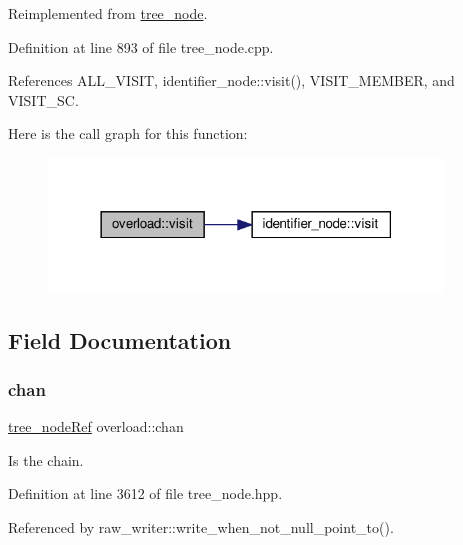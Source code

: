 Reimplemented from \hyperlink{classtree__node_aa9abba3f1b30e0be80b4a56b188c6ecc}{tree\+\_\+node}.



Definition at line 893 of file tree\+\_\+node.\+cpp.



References A\+L\+L\+\_\+\+V\+I\+S\+IT, identifier\+\_\+node\+::visit(), V\+I\+S\+I\+T\+\_\+\+M\+E\+M\+B\+ER, and V\+I\+S\+I\+T\+\_\+\+SC.

Here is the call graph for this function\+:
\nopagebreak
\begin{figure}[H]
\begin{center}
\leavevmode
\includegraphics[width=297pt]{d5/d1a/structoverload_af5069d7e549fbd84ae60f60b8efaf225_cgraph}
\end{center}
\end{figure}


\subsection{Field Documentation}
\mbox{\label{structoverload_a877c1bc09e35824204573c3f0bf4d80b}} 
\subsubsection{\texorpdfstring{chan}{chan}}
{\footnotesize\ttfamily \hyperlink{tree__node_8hpp_a6ee377554d1c4871ad66a337eaa67fd5}{tree\+\_\+node\+Ref} overload\+::chan}



Is the chain. 



Definition at line 3612 of file tree\+\_\+node.\+hpp.



Referenced by raw\+\_\+writer\+::write\+\_\+when\+\_\+not\+\_\+null\+\_\+point\+\_\+to().

\mbox{\label{structoverload_a49527c46fdcda381f476c6ffc84b8385}} 
